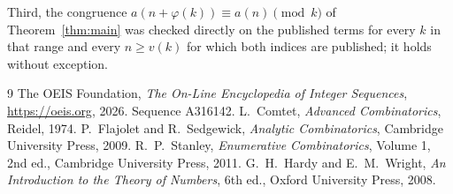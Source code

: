 \documentclass[11pt,a4paper]{article}
\theoremstyle{plain}
\theoremstyle{definition}
\begin{document}
Third, the congruence $a(n+\varphi(k))\equiv a(n)\pmod k$ of Theorem~\ref{thm:main} was
checked directly on the published terms for every $k$ in that range and every $n\ge v(k)$
for which both indices are published; it holds without exception.

\begin{thebibliography}{9}
 The OEIS Foundation, \emph{The On-Line Encyclopedia of Integer
Sequences}, \url{https://oeis.org}, 2026. Sequence A316142.
 L.~Comtet, \emph{Advanced Combinatorics}, Reidel, 1974.
 P.~Flajolet and R.~Sedgewick, \emph{Analytic Combinatorics}, Cambridge
University Press, 2009.
 R.~P.~Stanley, \emph{Enumerative Combinatorics}, Volume 1, 2nd ed.,
Cambridge University Press, 2011.
 G.~H.~Hardy and E.~M.~Wright, \emph{An Introduction to the Theory of
Numbers}, 6th ed., Oxford University Press, 2008.
\end{thebibliography}
\end{document}
